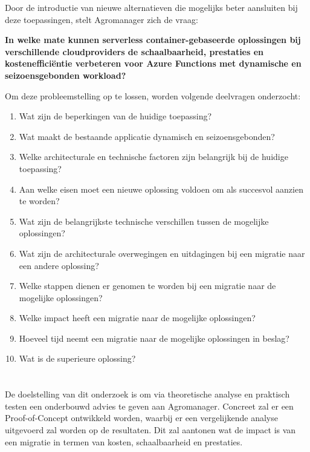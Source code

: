 Door de introductie van nieuwe alternatieven die mogelijks beter aansluiten bij deze toepassingen, stelt Agromanager zich de vraag:

\textbf{In welke mate kunnen serverless container-gebaseerde oplossingen bij verschillende cloudproviders de schaalbaarheid, prestaties en kostenefficiëntie verbeteren voor Azure Functions met dynamische en seizoensgebonden workload?}

Om deze probleemstelling op te lossen, worden volgende deelvragen onderzocht:

\begin{enumerate}
    \item Wat zijn de beperkingen van de huidige toepassing?
    \item Wat maakt de bestaande applicatie dynamisch en seizoensgebonden? 
    \item Welke architecturale en technische factoren zijn belangrijk bij de huidige toepassing? 
    \item Aan welke eisen moet een nieuwe oplossing voldoen om als succesvol aanzien te worden?
    \item Wat zijn de belangrijkste technische verschillen tussen de mogelijke oplossingen?
    \item Wat zijn de architecturale overwegingen en uitdagingen bij een migratie naar een andere oplossing?
    \item Welke stappen dienen er genomen te worden bij een migratie naar de mogelijke oplossingen?
    \item Welke impact heeft een migratie naar de mogelijke oplossingen?
    \item Hoeveel tijd neemt een migratie naar de mogelijke oplossingen in beslag?
    \item Wat is de superieure oplossing?
\end{enumerate} 

\section{}%
\label{sec:onderzoeksdoelstelling}

De doelstelling van dit onderzoek is om via theoretische analyse en praktisch testen een onderbouwd advies te geven aan Agromanager. Concreet zal er een Proof-of-Concept ontwikkeld worden, waarbij er een vergelijkende analyse uitgevoerd zal worden op de resultaten. Dit zal aantonen wat de impact is van een migratie in termen van kosten, schaalbaarheid en prestaties.

